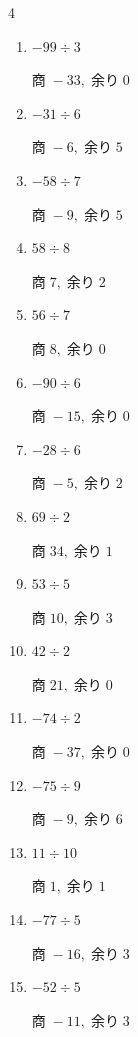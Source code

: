 \begin{multicols}{4}
\begin{enumerate}
  \item $-99 \div 3$

        $商\; -33,\; 余り\; 0$

\columnbreak %

  \item $-31 \div 6$

        $商\; -6,\; 余り\; 5$

  \item $-58 \div 7$

        $商\; -9,\; 余り\; 5$

  \item $58 \div 8$

        $商\; 7,\; 余り\; 2$

  \item $56 \div 7$

        $商\; 8,\; 余り\; 0$

  \item $-90 \div 6$

        $商\; -15,\; 余り\; 0$

  \item $-28 \div 6$

        $商\; -5,\; 余り\; 2$

  \item $69 \div 2$

        $商\; 34,\; 余り\; 1$

  \item $53 \div 5$

        $商\; 10,\; 余り\; 3$

  \item $42 \div 2$

        $商\; 21,\; 余り\; 0$

  \item $-74 \div 2$

        $商\; -37,\; 余り\; 0$

  \item $-75 \div 9$

        $商\; -9,\; 余り\; 6$

  \item $11 \div 10$

        $商\; 1,\; 余り\; 1$

  \item $-77 \div 5$

        $商\; -16,\; 余り\; 3$

  \item $-52 \div 5$

        $商\; -11,\; 余り\; 3$


\end{enumerate}
\end{multicols}
